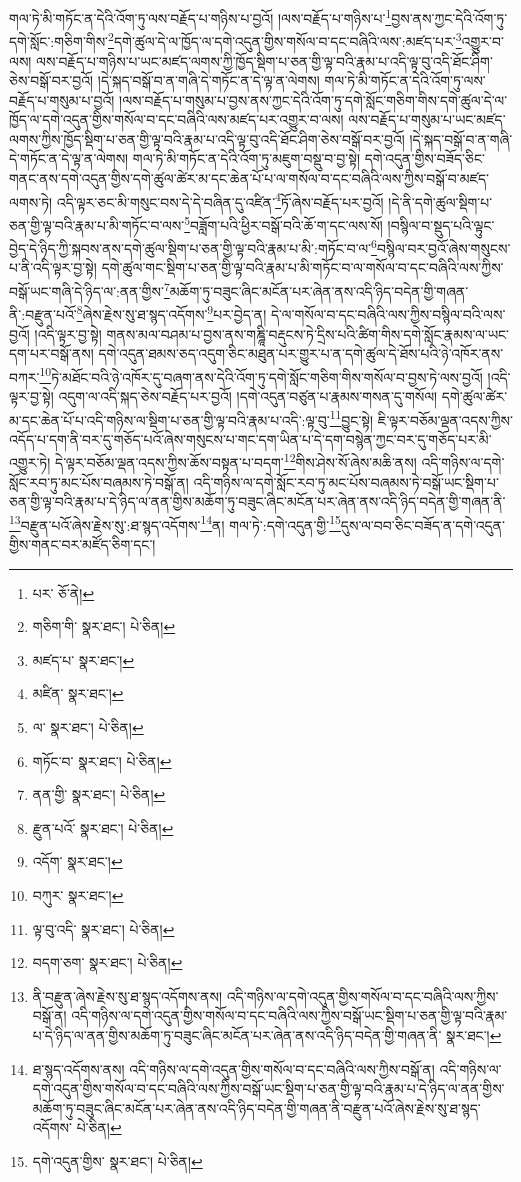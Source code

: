 གལ་ཏེ་མི་གཏོང་ན་དེའི་འོག་ཏུ་ལས་བརྗོད་པ་གཉིས་པ་བྱའོ། །ལས་བརྗོད་པ་གཉིས་པ་\footnote{པར་  ཅོ་ནེ། }བྱས་ནས་ཀྱང་དེའི་འོག་ཏུ་དགེ་སློང་:གཅིག་གིས་\footnote{གཅིག་གི་  སྣར་ཐང་།  པེ་ཅིན། }དགེ་ཚུལ་དེ་ལ་ཁྱོད་ལ་དགེ་འདུན་གྱིས་གསོལ་བ་དང་བཞིའི་ལས་:མཛད་པར་\footnote{མཛད་པ་  སྣར་ཐང་། }འགྱུར་བ་ལས། ལས་བརྗོད་པ་གཉིས་པ་ཡང་མཛད་ལགས་ཀྱི་ཁྱོད་སྡིག་པ་ཅན་གྱི་ལྟ་བའི་རྣམ་པ་འདི་ལྟ་བུ་འདི་ཐོང་ཤིག་ཅེས་བསྒོ་བར་བྱའོ། །དེ་སྐད་བསྒོ་བ་ན་གཞི་དེ་གཏོང་ན་དེ་ལྟ་ན་ལེགས། གལ་ཏེ་མི་གཏོང་ན་དེའི་འོག་ཏུ་ལས་བརྗོད་པ་གསུམ་པ་བྱའོ། །ལས་བརྗོད་པ་གསུམ་པ་བྱས་ནས་ཀྱང་དེའི་འོག་ཏུ་དགེ་སློང་གཅིག་གིས་དགེ་ཚུལ་དེ་ལ་ཁྱོད་ལ་དགེ་འདུན་གྱིས་གསོལ་བ་དང་བཞིའི་ལས་མཛད་པར་འགྱུར་བ་ལས། ལས་བརྗོད་པ་གསུམ་པ་ཡང་མཛད་ལགས་ཀྱིས་ཁྱོད་སྡིག་པ་ཅན་གྱི་ལྟ་བའི་རྣམ་པ་འདི་ལྟ་བུ་འདི་ཐོང་ཤིག་ཅེས་བསྒོ་བར་བྱའོ། །དེ་སྐད་བསྒོ་བ་ན་གཞི་དེ་གཏོང་ན་དེ་ལྟ་ན་ལེགས། གལ་ཏེ་མི་གཏོང་ན་དེའི་འོག་ཏུ་མཇུག་བསྡུ་བ་བྱ་སྟེ། དགེ་འདུན་གྱིས་བཟོད་ཅིང་གནང་ནས་དགེ་འདུན་གྱིས་དགེ་ཚུལ་ཚེར་མ་དང་ཆེན་པོ་པ་ལ་གསོལ་བ་དང་བཞིའི་ལས་ཀྱིས་བསྒོ་བ་མཛད་ལགས་ཏེ། འདི་ལྟར་ཅང་མི་གསུང་བས་དེ་དེ་བཞིན་དུ་འཛིན་\footnote{མཛིན་  སྣར་ཐང་། }ཏོ་ཞེས་བརྗོད་པར་བྱའོ། །དེ་ནི་དགེ་ཚུལ་སྡིག་པ་ཅན་གྱི་ལྟ་བའི་རྣམ་པ་མི་གཏོང་བ་ལས་\footnote{ལ་  སྣར་ཐང་།  པེ་ཅིན། }བཟློག་པའི་ཕྱིར་བསྒོ་བའི་ཆོ་ག་དང་ལས་སོ། །བསྙིལ་བ་སྡུད་པའི་ལྟུང་བྱེད་དེ་ཉིད་ཀྱི་སྐབས་ནས་དགེ་ཚུལ་སྡིག་པ་ཅན་གྱི་ལྟ་བའི་རྣམ་པ་མི་:གཏོང་བ་ལ་\footnote{གཏོང་བ་  སྣར་ཐང་།  པེ་ཅིན། }བསྙིལ་བར་བྱའོ་ཞེས་གསུངས་པ་ནི་འདི་ལྟར་བྱ་སྟེ། དགེ་ཚུལ་གང་སྡིག་པ་ཅན་གྱི་ལྟ་བའི་རྣམ་པ་མི་གཏོང་བ་ལ་གསོལ་བ་དང་བཞིའི་ལས་ཀྱིས་བསྒོ་ཡང་གཞི་དེ་ཉིད་ལ་:ནན་གྱིས་\footnote{ནན་གྱི་  སྣར་ཐང་།  པེ་ཅིན། }མཆོག་ཏུ་བཟུང་ཞིང་མངོན་པར་ཞེན་ནས་འདི་ཉིད་བདེན་གྱི་གཞན་ནི་:བརྫུན་པའོ་\footnote{རྫུན་པའོ་  སྣར་ཐང་།  པེ་ཅིན། }ཞེས་རྗེས་སུ་ཐ་སྙད་འདོགས་\footnote{འདོག་  སྣར་ཐང་། }པར་བྱེད་ན། དེ་ལ་གསོལ་བ་དང་བཞིའི་ལས་ཀྱིས་བསྙིལ་བའི་ལས་བྱའོ། །འདི་ལྟར་བྱ་སྟེ། གནས་མལ་བཤམ་པ་བྱས་ནས་གཎྜཱི་བརྡུངས་ཏེ་དྲིས་པའི་ཚིག་གིས་དགེ་སློང་རྣམས་ལ་ཡང་དག་པར་བསྒོ་ནས། དགེ་འདུན་ཐམས་ཅད་འདུག་ཅིང་མཐུན་པར་གྱུར་པ་ན་དགེ་ཚུལ་དེ་ཐོས་པའི་ཉེ་འཁོར་ནས་བཀར་\footnote{བཀུར་  སྣར་ཐང་། }ཏེ་མཐོང་བའི་ཉེ་འཁོར་དུ་བཞག་ནས་དེའི་འོག་ཏུ་དགེ་སློང་གཅིག་གིས་གསོལ་བ་བྱས་ཏེ་ལས་བྱའོ། །འདི་ལྟར་བྱ་སྟེ། འདུག་ལ་འདི་སྐད་ཅེས་བརྗོད་པར་བྱའོ། །དགེ་འདུན་བཙུན་པ་རྣམས་གསན་དུ་གསོལ། དགེ་ཚུལ་ཚེར་མ་དང་ཆེན་པོ་པ་འདི་གཉིས་ལ་སྡིག་པ་ཅན་གྱི་ལྟ་བའི་རྣམ་པ་འདི་:ལྟ་བུ་\footnote{ལྟ་བུ་འདི་  སྣར་ཐང་།  པེ་ཅིན། }བྱུང་སྟེ། ཇི་ལྟར་བཅོམ་ལྡན་འདས་ཀྱིས་འདོད་པ་དག་ནི་བར་དུ་གཅོད་པའོ་ཞེས་གསུངས་པ་གང་དག་ཡིན་པ་དེ་དག་བསྙེན་ཀྱང་བར་དུ་གཅོད་པར་མི་འགྱུར་ཏེ། དེ་ལྟར་བཅོམ་ལྡན་འདས་ཀྱིས་ཆོས་བསྟན་པ་བདག་\footnote{བདག་ཅག་  སྣར་ཐང་།  པེ་ཅིན། }གིས་ཤེས་སོ་ཞེས་མཆི་ནས། འདི་གཉིས་ལ་དགེ་སློང་རབ་ཏུ་མང་པོས་བཞམས་ཏེ་བསྒོ་ན། འདི་གཉིས་ལ་དགེ་སློང་རབ་ཏུ་མང་པོས་བཞམས་ཏེ་བསྒོ་ཡང་སྡིག་པ་ཅན་གྱི་ལྟ་བའི་རྣམ་པ་དེ་ཉིད་ལ་ནན་གྱིས་མཆོག་ཏུ་བཟུང་ཞིང་མངོན་པར་ཞེན་ནས་འདི་ཉིད་བདེན་གྱི་གཞན་ནི་\footnote{ནི་བརྫུན་ཞེས་རྗེས་སུ་ཐ་སྙད་འདོགས་ནས། འདི་གཉིས་ལ་དགེ་འདུན་གྱིས་གསོལ་བ་དང་བཞིའི་ལས་ཀྱིས་བསྒོ་ན། འདི་གཉིས་ལ་དགེ་འདུན་གྱིས་གསོལ་བ་དང་བཞིའི་ལས་ཀྱིས་བསྒོ་ཡང་སྡིག་པ་ཅན་གྱི་ལྟ་བའི་རྣམ་པ་དེ་ཉིད་ལ་ནན་གྱིས་མཆོག་ཏུ་བཟུང་ཞིང་མངོན་པར་ཞེན་ནས་འདི་ཉིད་བདེན་གྱི་གཞན་ནི་  སྣར་ཐང་། }བརྫུན་པའོ་ཞེས་རྗེས་སུ་:ཐ་སྙད་འདོགས་\footnote{ཐ་སྙད་འདོགས་ནས། འདི་གཉིས་ལ་དགེ་འདུན་གྱིས་གསོལ་བ་དང་བཞིའི་ལས་ཀྱིས་བསྒོ་ན། འདི་གཉིས་ལ་དགེ་འདུན་གྱིས་གསོལ་བ་དང་བཞིའི་ལས་ཀྱིས་བསྒོ་ཡང་སྡིག་པ་ཅན་གྱི་ལྟ་བའི་རྣམ་པ་དེ་ཉིད་ལ་ནན་གྱིས་མཆོག་ཏུ་བཟུང་ཞིང་མངོན་པར་ཞེན་ནས་འདི་ཉིད་བདེན་གྱི་གཞན་ནི་བརྫུན་པའོ་ཞེས་རྗེས་སུ་ཐ་སྙད་འདོགས་  པེ་ཅིན། }ན། གལ་ཏེ་:དགེ་འདུན་གྱི་\footnote{དགེ་འདུན་གྱིས་  སྣར་ཐང་།  པེ་ཅིན། }དུས་ལ་བབ་ཅིང་བཟོད་ན་དགེ་འདུན་གྱིས་གནང་བར་མཛོད་ཅིག་དང་། 